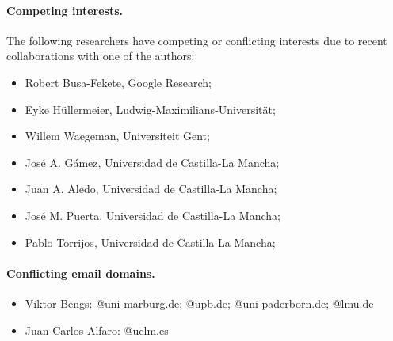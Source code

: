 \documentclass[pdflatex, sn-apa]{sn-jnl}
\begin{document}
\paragraph{Competing interests.}
%
%
The following researchers have competing or conflicting interests due to recent collaborations with one of the authors:
%
\begin{itemize}
%
	\item Robert Busa-Fekete, Google Research;
    \item Eyke Hüllermeier, Ludwig-Maximilians-Universität;
    \item Willem Waegeman, Universiteit Gent;
    \item José A. Gámez, Universidad de Castilla-La Mancha;
    \item Juan A. Aledo, Universidad de Castilla-La Mancha;
    \item José M. Puerta, Universidad de Castilla-La Mancha;
    \item Pablo Torrijos, Universidad de Castilla-La Mancha;
%
\end{itemize}
%
%

\paragraph{Conflicting email domains.}
%
%
\begin{itemize}
	\item Viktor Bengs: @uni-marburg.de; @upb.de; @uni-paderborn.de; @lmu.de
    \item Juan Carlos Alfaro: @uclm.es
\end{itemize}
%
%

\printbibliography
\end{document}

